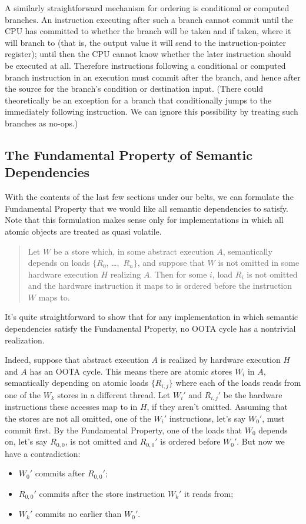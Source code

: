 \documentclass[10]{article}
\begin{document}
A similarly straightforward mechanism for ordering is conditional or
computed branches.
An instruction executing after such a branch cannot commit
until the CPU has committed to whether the branch will be taken and
if taken, where it will branch to (that is, the output value it will
send to the instruction-pointer register);
until then the CPU cannot know whether the later instruction should
be executed at all.
Therefore instructions following a conditional or computed branch
instruction in an execution must commit after the branch, and hence
after the source for the branch's condition or destination input.
(There could theoretically be an exception for a branch that
conditionally jumps to the immediately following instruction.
We can ignore this possibility by treating such branches as no-ops.)

\subsection{The Fundamental Property of Semantic Dependencies}
\label{sec:The Fundamental Property of Semantic Dependencies}

With the contents of the last few sections under our belts, we can
formulate the Fundamental Property that we would like all semantic
dependencies to satisfy.
Note that this formulation makes sense only for implementations in
which all atomic objects are treated as quasi volatile.
\begin{quote}
Let $W$ be a store which, in some abstract execution $A$, semantically
depends on loads $\{R_0$, \ldots,~$R_n\}$, and suppose that $W$ is not
omitted in some hardware execution $H$ realizing $A$.
Then for some $i$, load $R_i$ is not omitted and the hardware
instruction it maps to is ordered before the instruction $W$ maps to.
\end{quote}
It's quite straightforward to show that for any implementation in which
semantic dependencies satisfy the Fundamental Property, no OOTA cycle
has a nontrivial realization.

Indeed, suppose that abstract execution $A$ is realized by hardware
execution $H$ and $A$ has an OOTA cycle.
This means there are atomic stores $W_i$ in $A$,
semantically depending on atomic loads
$\{R_{i,j}\}$ where each of the loads reads from one of the $W_k$
stores in a different thread.
Let $W_i'$ and $R_{i,j}'$ be the hardware instructions these accesses
map to in $H$, if they aren't omitted.
Assuming that the stores are not all omitted,
one of the $W_i'$ instructions, let's say $W_0'$, must commit first.
By the Fundamental Property, one of the loads that $W_0$ depends on,
let's say $R_{0,0}$, is not omitted and $R_{0,0}'$ is ordered before $W_0'$.
But now we have a contradiction:
\begin{itemize}
\item	$W_0'$ commits after $R_{0,0}'$;
\item	$R_{0,0}'$ commits after the store instruction $W_k'$ it reads from;
\item	$W_k'$ commits no earlier than $W_0'$.
\end{itemize}
\end{document}
